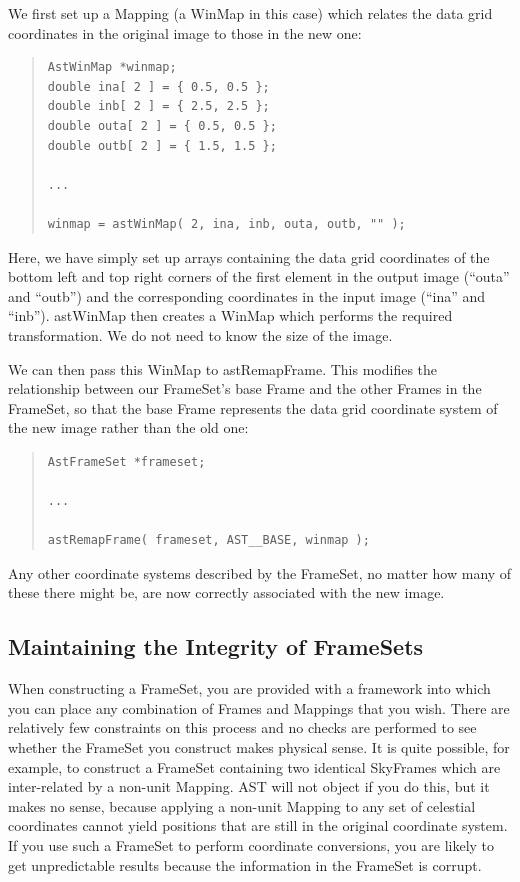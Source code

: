 \documentclass[twoside,11pt]{article}
\newcommand{\htmlref}[2]{#1}
\begin{document}
We first set up a \htmlref{Mapping}{Mapping} (a \htmlref{WinMap}{WinMap} in this case) which relates the
data grid coordinates in the original image to those in the new one:

\begin{quote}
\small
\begin{verbatim}
AstWinMap *winmap;
double ina[ 2 ] = { 0.5, 0.5 };
double inb[ 2 ] = { 2.5, 2.5 };
double outa[ 2 ] = { 0.5, 0.5 };
double outb[ 2 ] = { 1.5, 1.5 };

...

winmap = astWinMap( 2, ina, inb, outa, outb, "" );
\end{verbatim}
\normalsize
\end{quote}

Here, we have simply set up arrays containing the data grid
coordinates of the bottom left and top right corners of the first
element in the output image (``outa'' and ``outb'') and the
corresponding coordinates in the input image (``ina'' and
``inb''). \htmlref{astWinMap}{astWinMap} then creates a WinMap which performs the required
transformation. We do not need to know the size of the image.

We can then pass this WinMap to astRemapFrame. This modifies the
relationship between our FrameSet's base \htmlref{Frame}{Frame} and the other Frames in
the FrameSet, so that the base Frame represents the data grid
coordinate system of the new image rather than the old one:

\begin{quote}
\small
\begin{verbatim}
AstFrameSet *frameset;

...

astRemapFrame( frameset, AST__BASE, winmap );
\end{verbatim}
\normalsize
\end{quote}

Any other coordinate systems described by the FrameSet, no matter how
many of these there might be, are now correctly associated with the
new image.

\subsection{\label{ss:framesetintegrity}Maintaining the Integrity of FrameSets}

When constructing a \htmlref{FrameSet}{FrameSet}, you are provided with a framework into
which you can place any combination of Frames and Mappings that you
wish. There are relatively few constraints on this process and no
checks are performed to see whether the FrameSet you construct makes
physical sense.  It is quite possible, for example, to construct a
FrameSet containing two identical SkyFrames which are inter-related by
a non-unit \htmlref{Mapping}{Mapping}. AST will not object if you do this, but it makes
no sense, because applying a non-unit Mapping to any set of celestial
coordinates cannot yield positions that are still in the original
coordinate system.  If you use such a FrameSet to perform coordinate
conversions, you are likely to get unpredictable results because the
information in the FrameSet is corrupt.
\end{document}
